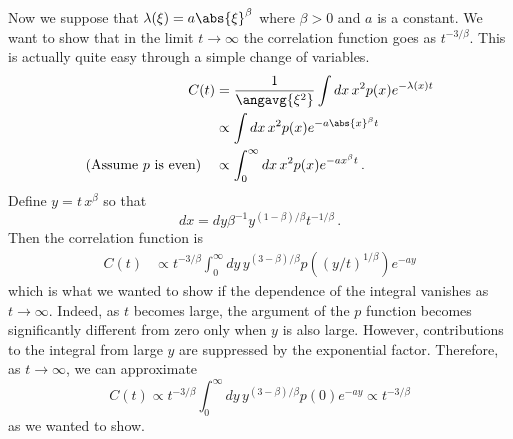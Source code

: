 
Now we suppose that $\lambda(\xi) = a \abs{\xi}^\beta$ where $\beta > 0$ and $a$ is a constant.
We want to show that in the limit $t \rightarrow \infty$ the correlation function goes as $t^{-3/\beta}$.
This is actually quite easy through a simple change of variables.
\begin{align*}
  C(t)
  &= \frac{1}{\angavg{\xi^2}} \int dx \, x^2 p(x) e^{-\lambda(x) t} \nonumber \\
  &\propto \int dx \, x^2 p(x) e^{-a \abs{x}^\beta t} \nonumber \\
  (\text{Assume }p\text{ is even}) \quad
  &\propto \int_0^\infty dx \, x^2 p(x) e^{-a x^\beta t} \, . \nonumber
\end{align*}
Define $y = t \, x^\beta$ so that
\begin{equation*}
  dx = dy \beta^{-1} y^{(1 - \beta )/ \beta} t^{-1/\beta} \, .
\end{equation*}
Then the correlation function is
\begin{align*}
  C(t)
  &\propto t^{-3/\beta} \int_0^\infty dy \, y^{(3 - \beta) / \beta}
    p\left( (y/t)^{1/\beta} \right) e^{-a y}
\end{align*}
which is what we wanted to show if the dependence of the integral vanishes as $t \rightarrow \infty$.
Indeed, as $t$ becomes large, the argument of the $p$ function becomes significantly different from zero only when $y$ is also large.
However, contributions to the integral from large $y$ are suppressed by the exponential factor.
Therefore, as $t \rightarrow \infty$, we can approximate
\begin{equation*}
  C(t) \propto t^{-3 / \beta} \int_0^\infty dy \, y^{(3 - \beta) / \beta} p(0) e^{-a y} \propto t^{-3 / \beta}
\end{equation*}
as we wanted to show.
